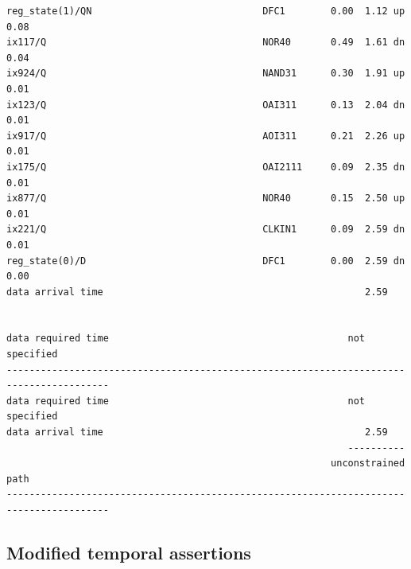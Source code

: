 \documentclass[a4paper,11pt]{article}
\begin{document}
\begin{verbatim}
reg_state(1)/QN                              DFC1        0.00  1.12 up             0.08
ix117/Q                                      NOR40       0.49  1.61 dn             0.04
ix924/Q                                      NAND31      0.30  1.91 up             0.01
ix123/Q                                      OAI311      0.13  2.04 dn             0.01
ix917/Q                                      AOI311      0.21  2.26 up             0.01
ix175/Q                                      OAI2111     0.09  2.35 dn             0.01
ix877/Q                                      NOR40       0.15  2.50 up             0.01
ix221/Q                                      CLKIN1      0.09  2.59 dn             0.01
reg_state(0)/D                               DFC1        0.00  2.59 dn             0.00
data arrival time                                              2.59


data required time                                          not specified
----------------------------------------------------------------------------------------
data required time                                          not specified
data arrival time                                              2.59
                                                            ----------
                                                         unconstrained path
----------------------------------------------------------------------------------------
\end{verbatim}
	
	\subsection{Modified temporal assertions}
\end{document}
